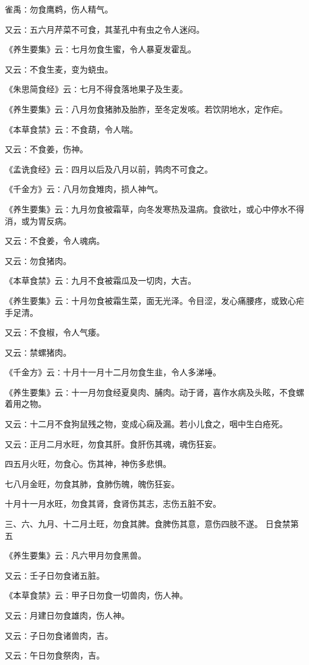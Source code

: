 \documentclass[a4paper,12pt,UTF8,twoside]{ctexbook}
\begin{document}
雀禹∶勿食鹰鹈，伤人精气。

又云∶五六月芹菜不可食，其茎孔中有虫之令人迷闷。

《养生要集》云∶七月勿食生蜜，令人暴夏发霍乱。

又云∶不食生麦，变为蛲虫。

《朱思简食经》云∶七月不得食落地果子及生麦。

《养生要集》云∶八月勿食猪肺及胎胙，至冬定发咳。若饮阴地水，定作疟。

《本草食禁》云∶不食葫，令人喘。

又云∶不食姜，伤神。

《孟诜食经》云∶四月以后及八月以前，鹑肉不可食之。

《千金方》云∶八月勿食雉肉，损人神气。

《养生要集》云∶九月勿食被霜草，向冬发寒热及温病。食欲吐，或心中停水不得消，或为胃反病。

又云∶不食姜，令人魂病。

又云∶勿食猪肉。

《本草食禁》云∶九月不食被霜瓜及一切肉，大吉。

《养生要集》云∶十月勿食被霜生菜，面无光泽。令目涩，发心痛腰疼，或致心疟手足清。

又云∶不食椒，令人气痿。

又云∶禁螺猪肉。

《千金方》云∶十月十一月十二月勿食生韭，令人多涕唾。

《养生要集》云∶十一月勿食经夏臭肉、脯肉。动于肾，喜作水病及头眩，不食螺着用之物。

又云∶十二月不食狗鼠残之物，变成心痫及漏。若小儿食之，咽中生白疮死。

又云∶正月二月水旺，勿食其肝。食肝伤其魂，魂伤狂妄。

四五月火旺，勿食心。伤其神，神伤多悲惧。

七八月金旺，勿食其肺，食肺伤魄，魄伤狂妄。

十月十一月水旺，勿食其肾，食肾伤其志，志伤五脏不安。

三、六、九月、十二月土旺，勿食其脾。食脾伤其意，意伤四肢不遂。
日食禁第五

《养生要集》云∶凡六甲月勿食黑兽。

又云∶壬子日勿食诸五脏。

《本草食禁》云∶甲子日勿食一切兽肉，伤人神。

又云∶月建日勿食雄肉，伤人神。

又云∶子日勿食诸兽肉，吉。

又云∶午日勿食祭肉，吉。
\end{document}
